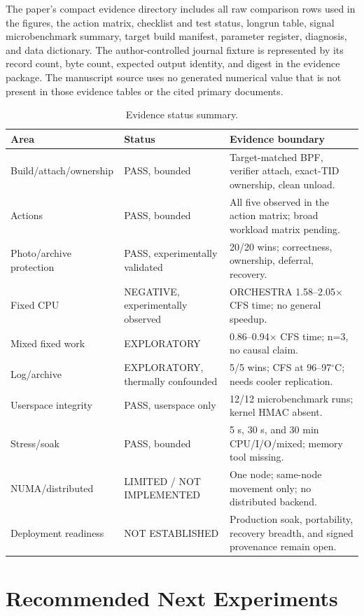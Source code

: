 \documentclass[10pt,letterpaper,twocolumn]{article}
\begin{document}
The paper's compact evidence directory includes all raw comparison rows used in the figures, the action matrix, checklist and test status, longrun table, signal microbenchmark summary, target build manifest, parameter register, diagnosis, and data dictionary. The author-controlled journal fixture is represented by its record count, byte count, expected output identity, and digest in the evidence package. The manuscript source uses no generated numerical value that is not present in those evidence tables or the cited primary documents.

\begin{table}[t]
\centering\scriptsize
\caption{Evidence status summary.}
\label{tab:status}
\begin{tabularx}{\columnwidth}{p{}p{}Y}
\toprule
Area & Status & Evidence boundary \\
\midrule
Build/attach/ownership & PASS, bounded & Target-matched BPF, verifier attach, exact-TID ownership, clean unload. \\
Actions & PASS, bounded & All five observed in the action matrix; broad workload matrix pending. \\
Photo/archive protection & PASS, experimentally validated & 20/20 wins; correctness, ownership, deferral, recovery. \\
Fixed CPU & NEGATIVE, experimentally observed & ORCHESTRA 1.58--2.05$\times$ CFS time; no general speedup. \\
Mixed fixed work & EXPLORATORY & 0.86--0.94$\times$ CFS time; n=3, no causal claim. \\
Log/archive & EXPLORATORY, thermally confounded & 5/5 wins; CFS at 96--97$^\circ$C; needs cooler replication. \\
Userspace integrity & PASS, userspace only & 12/12 microbenchmark runs; kernel HMAC absent. \\
Stress/soak & PASS, bounded & 5 s, 30 s, and 30 min CPU/I/O/mixed; memory tool missing. \\
NUMA/distributed & LIMITED / NOT IMPLEMENTED & One node; same-node movement only; no distributed backend. \\
Deployment readiness & NOT ESTABLISHED & Production soak, portability, recovery breadth, and signed provenance remain open. \\
\bottomrule
\end{tabularx}
\end{table}

\section{Recommended Next Experiments}
\end{document}

